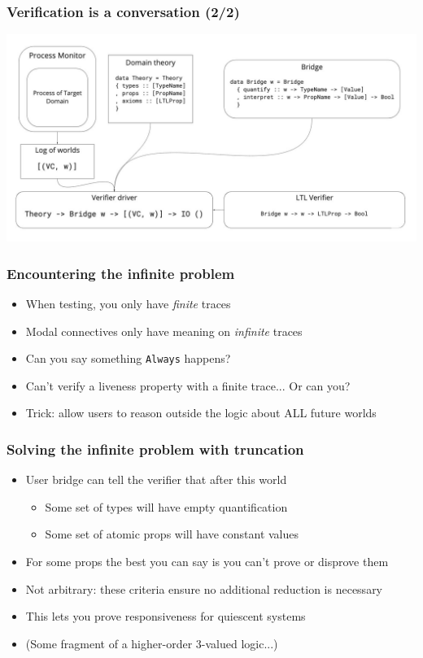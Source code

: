 \documentclass[12pt,aspectratio=169]{beamer}
\begin{document}
\begin{frame}
\frametitle{Verification is a conversation (2/2)}
  \includegraphics[scale=0.27]{diagram.jpg}
  \centering
\end{frame}

\begin{frame}
\frametitle{Encountering the infinite problem}
\begin{itemize}
  \item When testing, you only have \textit{finite} traces
  \item Modal connectives only have meaning on \textit{infinite} traces
  \item Can you say something \texttt{Always} happens?
  \item Can't verify a liveness property with a finite trace... Or can you?
  \item Trick: allow users to reason outside the logic about ALL future worlds
\end{itemize}
\end{frame}

\begin{frame}
\frametitle{Solving the infinite problem with truncation}
\begin{itemize}
  \item User bridge can tell the verifier that after this world
  \begin{itemize}
    \item Some set of types will have empty quantification
    \item Some set of atomic props will have constant values
  \end{itemize}
  \item For some props the best you can say is you can't prove or disprove them
  \item Not arbitrary: these criteria ensure no additional reduction is necessary
  \item This lets you prove responsiveness for quiescent systems
  \item (Some fragment of a higher-order 3-valued logic...)
\end{itemize}
\end{frame}
\end{document}
